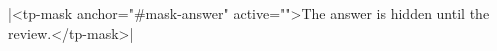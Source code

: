 \documentclass{article}
\begin{document}
\wcTpTextfield[id=mask-answer,label=Answer,value=Thursday,clearable]{}

\rawhtml|<tp-mask anchor="#mask-answer" active="">The answer is hidden until the review.</tp-mask>|
\end{document}

